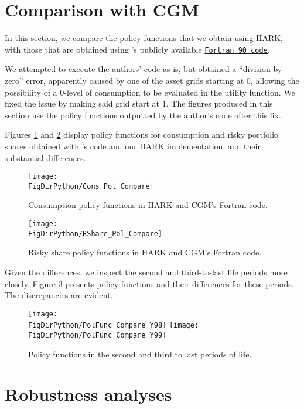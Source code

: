 \documentclass[../CGMPort.tex]{subfiles}
\begin{document}
\section{Comparison with CGM}\label{sec:Comparison}

In this section, we compare the policy functions that we obtain using HARK, 
with those that are obtained using \cite{cgm2015}'s publicly available 
\href{http://faculty.london.edu/fgomes/cgmcode.ZIP}{\texttt{Fortran 90 code}}.

We attempted to execute the authors' code as-is, but obtained a ``division by zero'' error, apparently caused by one of the asset grids starting at $0$,
allowing the possibility of a $0$-level of consumption to be evaluated in the
utility function. We fixed the issue by making said grid start at $1$. The
figures produced in this section use the policy functions outputted by the
author's code after this fix. 

Figures \ref{fig:heatmapCons} and \ref{fig:heatmapRshare} display policy 
functions for consumption and risky portfolio shares obtained with 
\cite{cgm2015}'s code and our HARK implementation, and their substantial 
differences.

\begin{figure}[h]
	\texttt{[image: \\FigDirPython/Cons\_Pol\_Compare]}
	\caption{Consumption policy functions in HARK and CGM's Fortran 
	code.}\label{fig:heatmapCons}
\end{figure}

\begin{figure}[h]
	\texttt{[image: \\FigDirPython/RShare\_Pol\_Compare]}
	\caption{Risky share policy functions in HARK and CGM's Fortran code.}
	\label{fig:heatmapRshare}
\end{figure}

Given the differences, we inspect the second and third-to-last life periods more closely. Figure \ref{fig:pol_funcs_last} presents policy functions and their differences for these periods. The discrepancies are evident.

\begin{figure}[h]
	\texttt{[image: \\FigDirPython/PolFunc\_Compare\_Y98]}
	\texttt{[image: \\FigDirPython/PolFunc\_Compare\_Y99]}
	\caption{Policy functions in the second and third to last periods of life.}
	\label{fig:pol_funcs_last}
\end{figure}


\section{Robustness analyses}\label{sec:Sensitivity}
\end{document}
